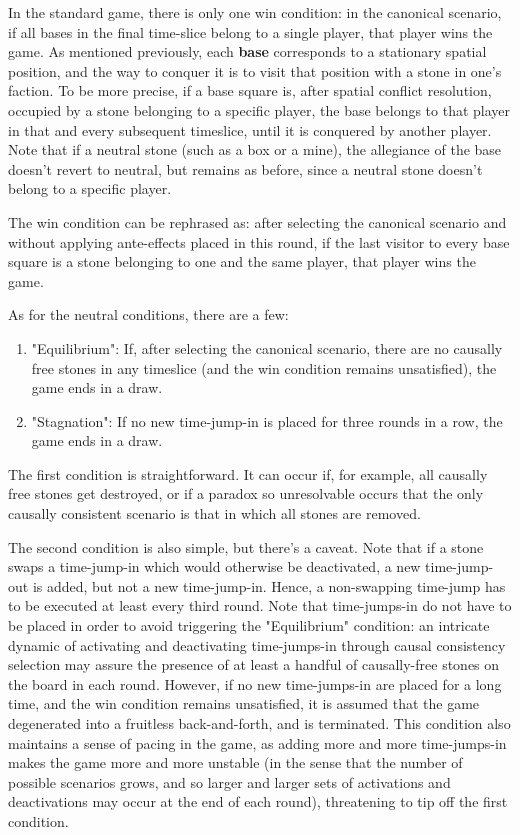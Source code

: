 \documentclass[12pt]{article}
\begin{document}
	In the standard game, there is only one win condition: in the canonical scenario, if all bases in the final time-slice belong to a single player, that player wins the game. As mentioned previously, each \textbf{base} corresponds to a stationary spatial position, and the way to conquer it is to visit that position with a stone in one's faction. To be more precise, if a base square is, after spatial conflict resolution, occupied by a stone belonging to a specific player, the base belongs to that player in that and every subsequent timeslice, until it is conquered by another player. Note that if a neutral stone (such as a box or a mine), the allegiance of the base doesn't revert to neutral, but remains as before, since a neutral stone doesn't belong to a specific player.
	
	The win condition can be rephrased as: after selecting the canonical scenario and without applying ante-effects placed in this round, if the last visitor to every base square is a stone belonging to one and the same player, that player wins the game.
	
	As for the neutral conditions, there are a few:
	\begin{enumerate}
		\item "Equilibrium": If, after selecting the canonical scenario, there are no causally free stones in any timeslice (and the win condition remains unsatisfied), the game ends in a draw.
		\item "Stagnation": If no new time-jump-in is placed for three rounds in a row, the game ends in a draw.
	\end{enumerate}
	
	The first condition is straightforward. It can occur if, for example, all causally free stones get destroyed, or if a paradox so unresolvable occurs that the only causally consistent scenario is that in which all stones are removed.

The second condition is also simple, but there's a caveat. Note that if a stone swaps a time-jump-in which would otherwise be deactivated, a new time-jump-out is added, but not a new time-jump-in. Hence, a non-swapping time-jump has to be executed at least every third round. Note that time-jumps-in do not have to be placed in order to avoid triggering the "Equilibrium" condition: an intricate dynamic of activating and deactivating time-jumps-in through causal consistency selection may assure the presence of at least a handful of causally-free stones on the board in each round. However, if no new time-jumps-in are placed for a long time, and the win condition remains unsatisfied, it is assumed that the game degenerated into a fruitless back-and-forth, and is terminated. This condition also maintains a sense of pacing in the game, as adding more and more time-jumps-in makes the game more and more unstable (in the sense that the number of possible scenarios grows, and so larger and larger sets of activations and deactivations may occur at the end of each round), threatening to tip off the first condition.
	
\end{document}
